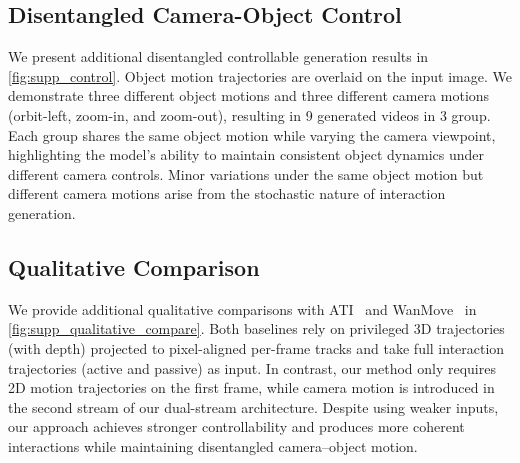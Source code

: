 \subsection{Disentangled Camera-Object Control}

We present additional disentangled controllable generation results in \cref{fig:supp_control}. Object motion trajectories are overlaid on the input image. We demonstrate three different object motions and three different camera motions (orbit-left, zoom-in, and zoom-out), resulting in 9 generated videos in 3 group. Each group shares the same object motion while varying the camera viewpoint, highlighting the model's ability to maintain consistent object dynamics under different camera controls. Minor variations under the same object motion but different camera motions arise from the stochastic nature of interaction generation.

\subsection{Qualitative Comparison}

We provide additional qualitative comparisons with ATI~\cite{wang2025ati} and WanMove~\cite{chu2025wanmove} in \cref{fig:supp_qualitative_compare}. Both baselines rely on privileged 3D trajectories (with depth) projected to pixel-aligned per-frame tracks and take full interaction trajectories (active and passive) as input. In contrast, our method only requires 2D motion trajectories on the first frame, while camera motion is introduced in the second stream of our dual-stream architecture. Despite using weaker inputs, our approach achieves stronger controllability and produces more coherent interactions while maintaining disentangled camera–object motion.
